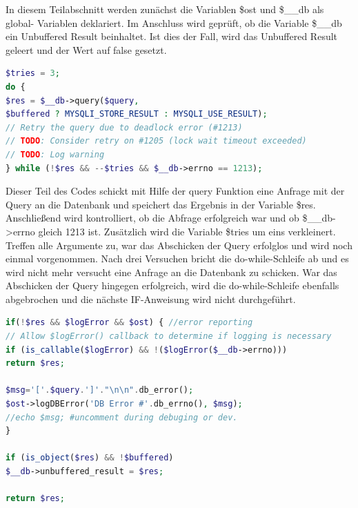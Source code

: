 In diesem Teilabschnitt werden zunächst die Variablen \$ost und \$\_\_db als global- Variablen deklariert.
Im Anschluss wird geprüft, ob die Variable \$\_\_db ein Unbuffered Result beinhaltet. Ist dies der Fall, wird das Unbuffered Result geleert und der Wert auf false gesetzt.

\newpage
\begin{lstlisting}[language=PHP, caption=mysqli.php/function-db\_query2, firstnumber=163]
$tries = 3;
do {
$res = $__db->query($query,
$buffered ? MYSQLI_STORE_RESULT : MYSQLI_USE_RESULT);
// Retry the query due to deadlock error (#1213)
// TODO: Consider retry on #1205 (lock wait timeout exceeded)
// TODO: Log warning
} while (!$res && --$tries && $__db->errno == 1213);
\end{lstlisting}

Dieser Teil des Codes schickt mit Hilfe der query Funktion eine Anfrage mit der Query an die Datenbank und speichert das Ergebnis in der Variable \$res. Anschließend wird kontrolliert, ob die Abfrage erfolgreich war und ob \$\_\_db->errno gleich 1213 ist. Zusätzlich wird die Variable \$tries um eins verkleinert. Treffen alle Argumente zu, war das Abschicken der Query erfolglos und wird noch einmal vorgenommen. Nach drei Versuchen bricht die do-while-Schleife ab und es wird nicht mehr versucht eine Anfrage an die Datenbank zu schicken.
War das Abschicken der Query hingegen erfolgreich, wird die do-while-Schleife ebenfalls abgebrochen und die nächste IF-Anweisung wird nicht durchgeführt.  
\newpage

\begin{lstlisting}[language=PHP, caption=mysqli.php/function-db\_query3, firstnumber=173]
if(!$res && $logError && $ost) { //error reporting
// Allow $logError() callback to determine if logging is necessary
if (is_callable($logError) && !($logError($__db->errno)))
return $res;

$msg='['.$query.']'."\n\n".db_error();
$ost->logDBError('DB Error #'.db_errno(), $msg);
//echo $msg; #uncomment during debuging or dev.
}

if (is_object($res) && !$buffered)
$__db->unbuffered_result = $res;

return $res;
\end{lstlisting}

